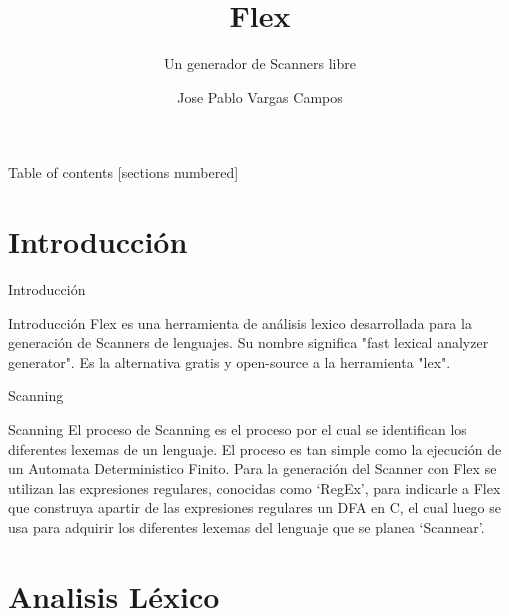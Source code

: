 \documentclass[10pt,xcolor={dvipsnames}]{beamer}
\title{Flex}
\subtitle{Un generador de Scanners libre}
\date{}
\author{Jose Pablo Vargas Campos \newline 2013116365}
\institute{Instituto Tecnológico de Costa Rica\newline Compiladores e Intérpretes \newline Semestre 2017 }
\begin{document}
\maketitle

\begin{frame}{Table of contents}
  [sections numbered]
  \tableofcontents[hideallsubsections]
\end{frame}

\section{Introducción}

\begin{frame}[fragile]{Introducción}


\begin{alertblock}{Introducción}
		Flex es una herramienta de análisis lexico desarrollada para la generación de Scanners de lenguajes. Su nombre significa "fast lexical analyzer generator". Es la alternativa gratis y open-source a la herramienta "lex". 
\end{alertblock}
    
\end{frame}
    
\begin{frame}[fragile]{Scanning}

	\begin{alertblock}{Scanning}
		El proceso de Scanning es el proceso por el cual se identifican los diferentes lexemas de un lenguaje. El proceso es tan simple como la ejecución de un Automata Deterministico Finito. Para la generación del Scanner con Flex se utilizan las expresiones regulares, conocidas como `RegEx', para indicarle a Flex que construya apartir de las expresiones regulares un DFA en C, el cual luego se usa para adquirir los diferentes lexemas del lenguaje que se planea `Scannear'.

	\end{alertblock}

\end{frame}


\section{Analisis Léxico}
\end{document}
